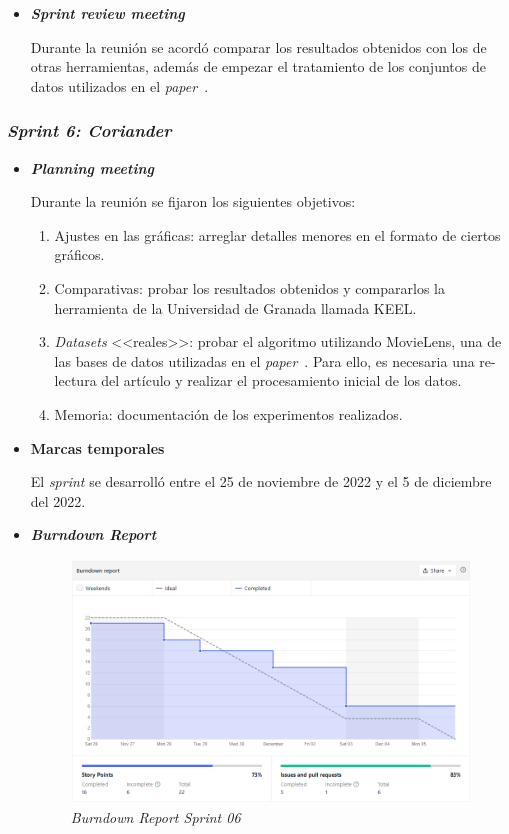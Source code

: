 \begin{itemize}
	\item \textbf{\textit{Sprint review meeting}}

	Durante la reunión se acordó comparar los resultados obtenidos con los de otras herramientas, además de empezar el tratamiento de los conjuntos de datos utilizados en el \textit{paper}~\cite{zhou2021SemisupervisedRecommendationAttack}.
	
\end{itemize}


\subsubsection{\textit{Sprint 6: Coriander}}
\begin{itemize}
	\item \textbf{\textit{Planning meeting}}
	
	Durante la reunión se fijaron los siguientes objetivos:
	
		\begin{enumerate}
		\item Ajustes en las gráficas: arreglar detalles menores en el formato de ciertos gráficos.
		\item Comparativas: probar los resultados obtenidos y compararlos la herramienta de la Universidad de Granada llamada KEEL.
		\item \textit{Datasets} <<reales>>: probar el algoritmo utilizando MovieLens, una de las bases de datos utilizadas en el \textit{paper}~\cite{zhou2021SemisupervisedRecommendationAttack}. Para ello, es necesaria una re-lectura del artículo y realizar el procesamiento inicial de los datos.
		\item Memoria: documentación de los experimentos realizados.
	\end{enumerate}

	\item \textbf{Marcas temporales}	
		
	El \textit{sprint} se desarrolló entre el 25 de noviembre de 2022 y el 5 de diciembre del 2022.
	
	\item \textbf{\textit{Burndown Report}}
		\begin{figure}[h]
			\caption{\textit{Burndown Report Sprint 06}}
			\centering
			\includegraphics[width=\textwidth]{../img/anexos/bdr/s06_bdr}
		\end{figure}
	

\end{itemize}
